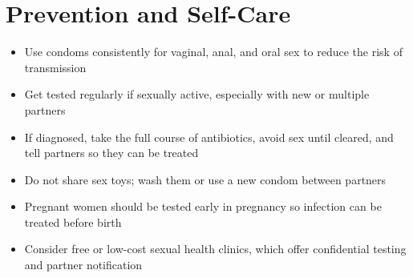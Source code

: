 \section*{Prevention and Self-Care}
\begin{itemize}
    \item Use condoms consistently for vaginal, anal, and oral sex to reduce the risk of transmission
    \item Get tested regularly if sexually active, especially with new or multiple partners
    \item If diagnosed, take the full course of antibiotics, avoid sex until cleared, and tell partners so they can be treated
    \item Do not share sex toys; wash them or use a new condom between partners
    \item Pregnant women should be tested early in pregnancy so infection can be treated before birth
    \item Consider free or low-cost sexual health clinics, which offer confidential testing and partner notification
\end{itemize}
